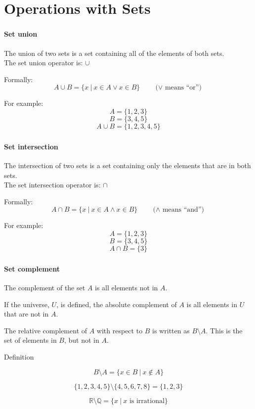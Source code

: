 \documentclass{beamer}
\newenvironment{compactmath}[1][\normalsize]%
	{\begin{minipage}{\textwidth}\vspace{-0.75\baselineskip}#1\begin{equation*}}
	{\end{equation*}\end{minipage}}
\begin{document}
	\section{Operations with Sets}
	\begin{frame}
		\frametitle{\secname}
		\framesubtitle{Set union}
		The union of two sets is a set containing all of the elements of both sets.
		\\
		The set union operator is: $\cup$

		Formally:
		\[A \cup B = \{x\ |\ x \in A \vee x \in B\} \qquad \text{($\vee$ means ``or'')}\]

		For example:
		\[A = \{1, 2, 3\}\]
		\[B = \{3, 4, 5\}\]
		\[A \cup B = \{1, 2, 3, 4, 5\}\]
	\end{frame}
	\begin{frame}
		\frametitle{\secname}
		\framesubtitle{Set intersection}
		The intersection of two sets is a set containing only the elements that are in both sets.
		\\
		The set intersection operator is: $\cap$

		Formally:
		\[A \cap B = \{x\ |\ x \in A \wedge x \in B\} \qquad \text{($\wedge$ means ``and'')}\]

		For example:
		\[A = \{1, 2, 3\}\]
		\[B = \{3, 4, 5\}\]
		\[A \cap B = \{3\}\]
	\end{frame}
	\begin{frame}
		\frametitle{\secname}
		\framesubtitle{Set complement}
		The \alert{complement} of the set $A$ is all elements not in $A$.

		If the universe, $U$, is defined, the \alert{absolute complement} of $A$ is all elements in $U$ that are not in $A$.
		
		The \alert{relative complement} of $A$ with respect to $B$ is written as $B \setminus A$. This is the set of elements in $B$, but not in $A$.
		\begin{block}{Definition}
			\begin{compactmath}[\large]
				B \setminus A = \{x \in B\ |\ x \notin A\}
			\end{compactmath}
		\end{block}
		\begin{examples}
			\begin{compactmath}
				\{1, 2, 3, 4, 5\} \setminus \{4, 5, 6, 7, 8\} = \{1, 2, 3\}
			\end{compactmath}
			\begin{compactmath}
				\mathbb{R} \setminus \mathbb{Q} = \{x\ |\ x \text{ is irrational}\}
			\end{compactmath}
		\end{examples}
	\end{frame}
\end{document}
